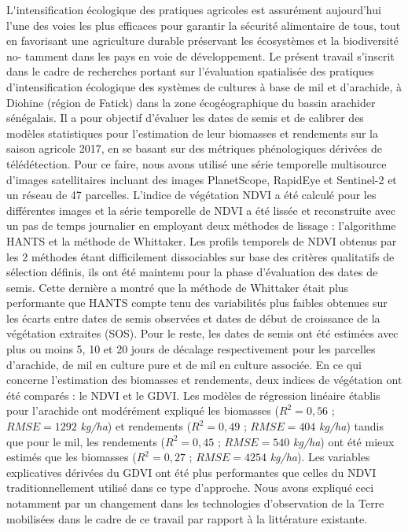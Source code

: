 \documentclass[a4paper,12pt,oneside,chapterprefix=false]{scrbook}
\newenvironment{abstract}%
{\cleardoublepage\thispagestyle{empty}\null\vfill\begin{center}%
\sffamily\bfseries \abstractname \end{center}}%
{\vfill\null}
\begin{document}
\let\cleardoublepage\clearpage


\frontmatter
  
  \setcounter{tocdepth}{2}
    \begin{abstract}
    \thispagestyle{plain}
    
    \lettrine{L} 'intensification écologique des pratiques agricoles est assurément aujourd’hui l’une des voies les plus efficaces pour garantir la sécurité alimentaire de tous, tout en
    favorisant une agriculture durable préservant les écosystèmes et la biodiversité no-
    tamment dans les pays en voie de développement. Le présent travail s’inscrit dans le
    cadre de recherches portant sur l’évaluation spatialisée des pratiques d’intensification écologique des systèmes de cultures à base de mil et d’arachide, à Diohine (région de Fatick) dans la zone écogéographique du bassin arachider sénégalais. Il a pour objectif d’évaluer les dates de semis et de calibrer des modèles statistiques pour l’estimation de leur biomasses et rendements sur la saison agricole 2017, en se basant sur des métriques phénologiques dérivées de télédétection. Pour ce faire, nous avons utilisé une série temporelle multisource d’images satellitaires incluant des images PlanetScope, RapidEye et Sentinel-2 et un réseau de 47 parcelles. L’indice de végétation NDVI a été calculé pour les différentes images et la série temporelle de NDVI a été lissée et reconstruite avec un pas de temps journalier en employant deux méthodes de lissage : l’algorithme HANTS et la méthode de Whittaker. Les profils temporels de NDVI obtenus par les 2 méthodes étant difficilement dissociables sur base des critères qualitatifs de sélection définis, ils ont été maintenu pour la phase d’évaluation des dates de semis. Cette dernière a montré que la méthode de Whittaker était plus performante que HANTS compte tenu des variabilités plus faibles obtenues sur les écarts entre dates de semis observées et dates de début de croissance de la végétation extraites (SOS). Pour le reste, les dates de semis ont été estimées avec plus ou moins 5, 10 et 20 jours de décalage respectivement pour les parcelles d’arachide, de mil en culture pure et de mil en culture associée. En ce qui concerne l’estimation des biomasses et rendements, deux indices de végétation ont été comparés : le NDVI et le GDVI. Les modèles de régression linéaire établis pour l’arachide ont modérément expliqué les biomasses ($R^{2} = 0,56$ ; $RMSE = 1292$ \emph{kg/ha}) et rendements ($R^{2} = 0,49$ ; $RMSE = 404$ \emph{kg/ha}) tandis que pour le mil, les rendements ($R^{2} = 0,45$ ; $RMSE = 540$ \emph{kg/ha}) ont été mieux estimés que les biomasses ($R^{2} = 0,27$ ; $RMSE = 4254$ \emph{kg/ha}). Les variables explicatives dérivées du GDVI ont été plus performantes que celles du NDVI traditionnellement utilisé dans ce type d’approche. Nous avons expliqué ceci notamment par un changement dans les technologies d’observation de la Terre mobilisées dans le cadre de ce travail par rapport à la littérature existante.
    

\end{abstract}
\end{document}
